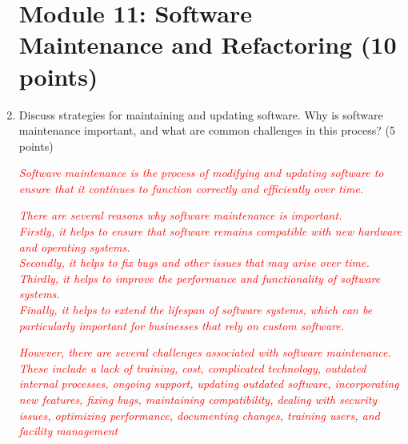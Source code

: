 \documentclass{article}
\begin{document}
\begin{enumerate}
            \section{Module 11: Software Maintenance and Refactoring
            (10 points)}
            \item Discuss strategies for maintaining and updating software. Why is software
            maintenance important, and what are common challenges in this process?
            (5 points)\par
            \textcolor{red}{\textit{Software maintenance is the process of modifying and updating software to ensure that it continues 
            to function correctly and efficiently over time.}}\par
            \textcolor{red}{\textit{There are several reasons why software maintenance is important.\\ 
            Firstly, it helps to ensure that software remains compatible with new hardware and operating systems.\\
             Secondly, it helps to fix bugs and other issues that may arise over time. \\
             Thirdly, it helps to improve the performance and functionality of software systems. \\
             Finally, it helps to extend the lifespan of software systems, which can be particularly important for businesses 
             that rely on custom software.}}\par
             \textcolor{red}{\textit{However, there are several challenges associated with software maintenance. \\
             These include a lack of training, cost, complicated technology, outdated internal processes, ongoing support, 
             updating outdated software, incorporating new features, fixing bugs, maintaining compatibility, dealing with security issues, 
             optimizing performance, documenting changes, training users, and facility management}}


\end{enumerate}
\end{document}
